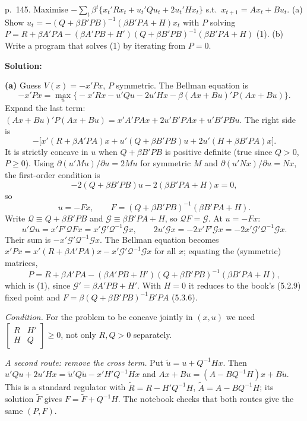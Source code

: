 \documentclass[12pt, letterpaper]{article}
\begin{document}
\begin{tcolorbox}[oddbox,title={Exercise 5.1 \quad Riccati equation with a cross-product term}]
\begin{tcolorbox}[questionbox]
p.~145. Maximise $-\sum_t\beta^t\{x_t'Rx_t+u_t'Qu_t+2u_t'Hx_t\}$ s.t.\ $x_{t+1}=Ax_t+Bu_t$.
(a) Show $u_t=-(Q+\beta B'PB)^{-1}(\beta B'PA+H)x_t$ with $P$ solving
$P=R+\beta A'PA-(\beta A'PB+H')(Q+\beta B'PB)^{-1}(\beta B'PA+H)$ \;(1).
(b) Write a program that solves (1) by iterating from $P=0$.
\end{tcolorbox}

\textbf{Solution:}

\textbf{(a)} Guess $V(x)=-x'Px$, $P$ symmetric. The Bellman equation is
\[
-x'Px=\max_u\big\{-x'Rx-u'Qu-2u'Hx-\beta(Ax+Bu)'P(Ax+Bu)\big\}.
\]
Expand the last term: $(Ax+Bu)'P(Ax+Bu)=x'A'PAx+2u'B'PAx+u'B'PBu$. The right side is
\[
-\big[x'(R+\beta A'PA)x+u'(Q+\beta B'PB)u+2u'(H+\beta B'PA)x\big].
\]
It is strictly concave in $u$ when $Q+\beta B'PB$ is positive definite (true since $Q>0$, $P\ge0$).
Using $\partial(u'Mu)/\partial u=2Mu$ for symmetric $M$ and $\partial(u'Nx)/\partial u=Nx$, the
first-order condition is
\[
-2(Q+\beta B'PB)u-2(\beta B'PA+H)x=0,
\]
so
\[
\boxed{u=-Fx,\qquad F=(Q+\beta B'PB)^{-1}(\beta B'PA+H).}
\]
Write $\mathcal Q\equiv Q+\beta B'PB$ and $\mathcal G\equiv\beta B'PA+H$, so $\mathcal QF=\mathcal G$.
At $u=-Fx$:
\[
u'\mathcal Qu=x'F'\mathcal QFx=x'\mathcal G'\mathcal Q^{-1}\mathcal Gx,\qquad
2u'\mathcal Gx=-2x'F'\mathcal Gx=-2x'\mathcal G'\mathcal Q^{-1}\mathcal Gx .
\]
Their sum is $-x'\mathcal G'\mathcal Q^{-1}\mathcal Gx$. The Bellman equation becomes
$x'Px=x'(R+\beta A'PA)x-x'\mathcal G'\mathcal Q^{-1}\mathcal Gx$ for all $x$; equating the
(symmetric) matrices,
\[
\boxed{P=R+\beta A'PA-(\beta A'PB+H')(Q+\beta B'PB)^{-1}(\beta B'PA+H),}
\]
which is (1), since $\mathcal G'=\beta A'PB+H'$. With $H=0$ it reduces to the book's (5.2.9) fixed
point and $F=\beta(Q+\beta B'PB)^{-1}B'PA$ (5.3.6). \checkmark

\emph{Condition.} For the problem to be concave jointly in $(x,u)$ we need
$\begin{bmatrix}R&H'\\H&Q\end{bmatrix}\ge0$, not only $R,Q>0$ separately.

\emph{A second route: remove the cross term.} Put $\tilde u=u+Q^{-1}Hx$. Then
$u'Qu+2u'Hx=\tilde u'Q\tilde u-x'H'Q^{-1}Hx$ and $Ax+Bu=(A-BQ^{-1}H)x+B\tilde u$. This is a
standard regulator with $\tilde R=R-H'Q^{-1}H$, $\tilde A=A-BQ^{-1}H$; its solution $\tilde F$ gives
$F=\tilde F+Q^{-1}H$. The notebook checks that both routes give the same $(P,F)$.


\end{tcolorbox}
\end{document}
